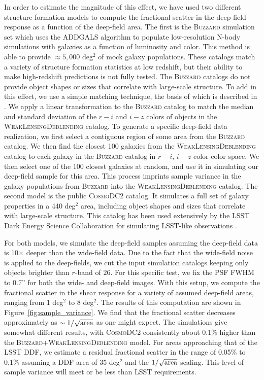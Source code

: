 \documentclass[twocolumn]{openjournal}
\makeatletter
\newcommand{\descwl}{\textsc{WeakLensingDeblending}\@\xspace}
\newcommand{\cosmodctwo}{\textsc{CosmoDC2}\@\xspace}
\newcommand{\buzzard}{\textsc{Buzzard}\@\xspace}
\makeatother
\begin{document}
In order to estimate the magnitude of this effect, we have used two different structure
formation models to compute the fractional scatter in the deep-field response as a
function of the deep-field area. The first is the \buzzard simulation set
\citep{derose2019buzzard,derose2021Buzzard} which uses the \textsc{ADDGALS} \citep{addgals} algorithm to
populate low-resolution N-body simulations with galaxies as a function of luminosity
and color. This method is able to provide $\approx5,000$ deg$^2$ of mock galaxy
populations. These catalogs match a variety of structure formation statistics at low
redshift, but their ability to make high-redshift predictions is not fully tested. The
\buzzard catalogs do not provide object shapes or sizes that correlate with large-scale
structure. To add in this effect, we use a simple matching technique, the basis of which
is described in \citet{galsampler}. We apply a linear transformation to the \buzzard
catalog to match the median and standard deviation of the $r-i$ and $i-z$ colors  of
objects in the \descwl catalog. To generate a specific deep-field data realization, we
first select a contiguous region of some area from the \buzzard catalog. We then find
the closest 100 galaxies from the \descwl catalog to each galaxy in the \buzzard catalog
in $r-i$, $i-z$ color-color space. We then select one of the 100 closest galaxies at
random, and use it in simulating our deep-field sample for this area. This process
imprints sample variance in the galaxy populations from \buzzard into the \descwl
catalog. The second model is the public \cosmodctwo \citep{cosmodc2} catalog. It
simulates a full set of galaxy properties in a 440 deg$^2$ area, including object shapes
and sizes that correlate with large-scale structure. This catalog has been used
extensively by the LSST Dark Energy Science Collaboration for simulating LSST-like
observations \citep{dc2,dc2note}.

For both models, we simulate the deep-field samples assuming the deep-field data is
10$\times$ deeper than the wide-field data. Due to the fact that the wide-field noise is
applied to the deep-fields, we cut the input simulation catalogs keeping only objects
brighter than $r$-band of $26$. For this specific test, we fix the PSF FWHM to 0.7'' for
both the wide- and deep-field images. With this setup, we compute the fractional scatter
in the shear response for a variety of assumed deep-field areas, ranging from 1 deg$^2$
to 8 deg$^2$. The results of this computation are shown in
Figure~\ref{fig:sample_variance}. We find that the fractional scatter decreases
approximately as $\sim1/\sqrt{\rm area}$ as one might expect. The simulations give
somewhat different results, with \cosmodctwo consistently about 0.1\% higher than the
\buzzard+\descwl model. For areas approaching that of the LSST DDF, we estimate a
residual fractional scatter in the range of 0.05\% to 0.1\% assuming a DDF area of 35
deg$^2$ and the $1/\sqrt{\rm area}$ scaling. This level of sample variance will meet or
be less than LSST requirements.
\end{document}
